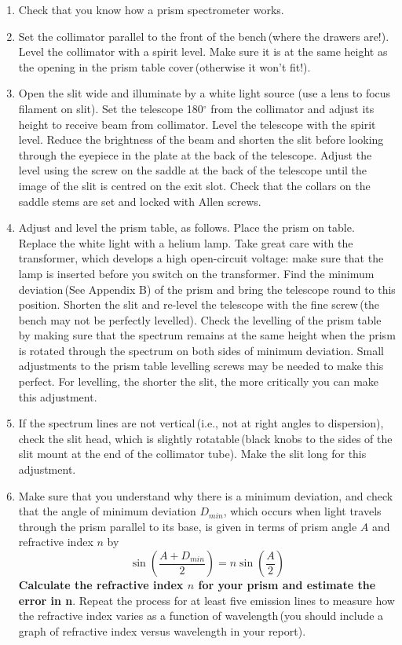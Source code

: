 \documentclass[12pt]{article}
\begin{document}
\begin{enumerate}
\item Check that you know how a prism spectrometer works.

\item Set the collimator parallel to the front of the bench\,(where the drawers are!). Level the collimator with a spirit level. Make sure it is at the same height as the opening in the prism table cover\,(otherwise it won't fit!).

\item Open the slit wide and illuminate by a white light source (use a lens to focus filament on slit). Set the telescope 180$^\circ$ from the collimator and adjust its height to receive beam from  collimator. Level the telescope with the spirit level. Reduce the brightness of the beam and shorten the slit before looking through the eyepiece in the plate at the back of the telescope. Adjust the level using the screw on the saddle at the back of the telescope until the image of the slit is centred on the exit slot. Check that the collars on the saddle stems are set and locked with Allen screws.

\item Adjust and level the prism table, as follows.  Place the prism on table. Replace the white light with a helium lamp. Take great care with the transformer, which develops a high open-circuit voltage: make sure that the lamp is inserted before you switch on the transformer. Find the minimum deviation\,(See Appendix B) of the prism and bring the telescope round to this position. Shorten the slit and re-level the telescope with the fine screw\,(the bench may not be perfectly levelled). Check the levelling of the prism table  by making sure that the spectrum remains at the same height  when the prism is rotated through the spectrum on both sides of minimum deviation. Small  adjustments to the prism table levelling screws may be needed to make this perfect. For levelling, the shorter the slit, the more critically you can make this adjustment.

\item If the spectrum lines are not vertical\,(i.e., not at right angles to dispersion), check the slit head, which is slightly rotatable\,(black knobs to the sides of the slit mount at the end of the collimator tube). Make the slit long for this adjustment.

\item Make sure that you understand why there is a minimum deviation, and check that the angle of minimum deviation $D_{min}$, which occurs when light travels through the prism parallel to its base, is given in terms of prism angle $A$ and refractive index $n$ by \[  \sin \left( \frac{A+D_{min}}{2} \right) = n \sin \left( \frac{A}{2} \right)   \] {\bf Calculate the refractive index $n$ for your prism and estimate the error in n}. Repeat the process for at least five emission lines to measure how the refractive index varies as a function of wavelength\,(you should include a graph of refractive index versus wavelength in your report).
\end{enumerate}
\end{document}
